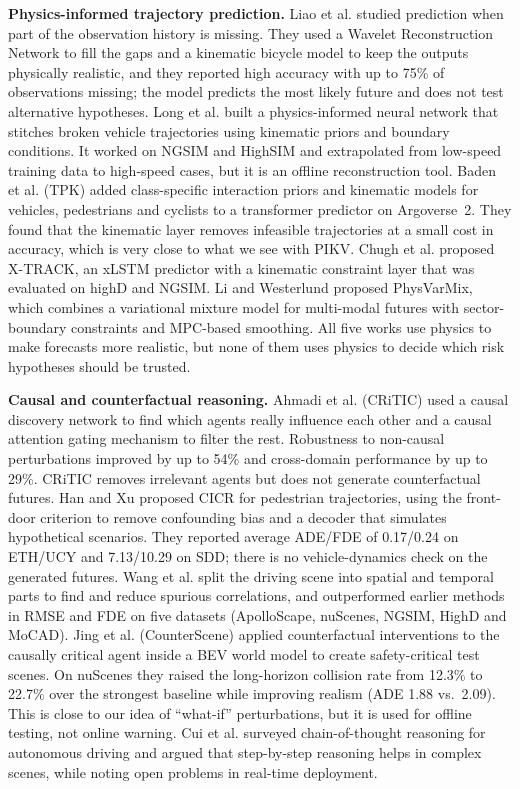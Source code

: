 \documentclass[preprint,12pt]{elsarticle}
\begin{document}
\textbf{Physics-informed trajectory prediction.} Liao et al. \cite{liao2024physics} studied prediction when part of the observation history is missing. They used a Wavelet Reconstruction Network to fill the gaps and a kinematic bicycle model to keep the outputs physically realistic, and they reported high accuracy with up to 75\% of observations missing; the model predicts the most likely future and does not test alternative hypotheses. Long et al. \cite{long2024pinn} built a physics-informed neural network that stitches broken vehicle trajectories using kinematic priors and boundary conditions. It worked on NGSIM and HighSIM and extrapolated from low-speed training data to high-speed cases, but it is an offline reconstruction tool. Baden et al. \cite{baden2025tpk} (TPK) added class-specific interaction priors and kinematic models for vehicles, pedestrians and cyclists to a transformer predictor on Argoverse~2. They found that the kinematic layer removes infeasible trajectories at a small cost in accuracy, which is very close to what we see with PIKV. Chugh et al. \cite{chugh2025xtrack} proposed X-TRACK, an xLSTM predictor with a kinematic constraint layer that was evaluated on highD and NGSIM. Li and Westerlund \cite{li2025physvarmix} proposed PhysVarMix, which combines a variational mixture model for multi-modal futures with sector-boundary constraints and MPC-based smoothing. All five works use physics to make forecasts more realistic, but none of them uses physics to decide which risk hypotheses should be trusted.

\textbf{Causal and counterfactual reasoning.} Ahmadi et al. \cite{ahmadi2025critic} (CRiTIC) used a causal discovery network to find which agents really influence each other and a causal attention gating mechanism to filter the rest. Robustness to non-causal perturbations improved by up to 54\% and cross-domain performance by up to 29\%. CRiTIC removes irrelevant agents but does not generate counterfactual futures. Han and Xu \cite{han2025cicr} proposed CICR for pedestrian trajectories, using the front-door criterion to remove confounding bias and a decoder that simulates hypothetical scenarios. They reported average ADE/FDE of 0.17/0.24 on ETH/UCY and 7.13/10.29 on SDD; there is no vehicle-dynamics check on the generated futures. Wang et al. \cite{wang2025beyond} split the driving scene into spatial and temporal parts to find and reduce spurious correlations, and outperformed earlier methods in RMSE and FDE on five datasets (ApolloScape, nuScenes, NGSIM, HighD and MoCAD). Jing et al. \cite{jing2026counterscene} (CounterScene) applied counterfactual interventions to the causally critical agent inside a BEV world model to create safety-critical test scenes. On nuScenes they raised the long-horizon collision rate from 12.3\% to 22.7\% over the strongest baseline while improving realism (ADE 1.88 vs.\ 2.09). This is close to our idea of ``what-if'' perturbations, but it is used for offline testing, not online warning. Cui et al. \cite{cui2025cot} surveyed chain-of-thought reasoning for autonomous driving and argued that step-by-step reasoning helps in complex scenes, while noting open problems in real-time deployment.
\end{document}
